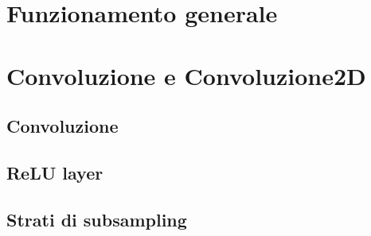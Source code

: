 \section{Funzionamento generale}
\section{Convoluzione e Convoluzione2D}
\subsection{Convoluzione}
\subsection{ReLU layer}
\subsection{Strati di subsampling}

